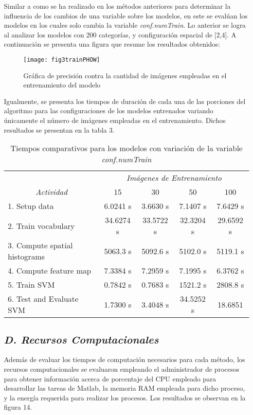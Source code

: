 \documentclass[10pt,twocolumn,letterpaper]{article}
\begin{document}
Similar a como se ha realizado en los métodos anteriores para determinar la influencia de los cambios de una variable sobre los modelos, en este se evalúan los modelos en los cuales solo cambia la variable \textit{conf.numTrain}. Lo anterior se logra al analizar los modelos con 200 categorías, y configuración espacial de [2,4]. A continuación se presenta una figura que resume los resultados obtenidos:

\begin{figure}
\begin{center}
   \texttt{[image: fig3trainPHOW]}
\end{center}
   \caption{Gráfica de precisión contra la cantidad de imágenes empleadas en el entrenamiento del modelo}
\end{figure}

Igualmente, se presenta los tiempos de duración de cada una de las porciones del algoritmo para las configuraciones de los modelos entrenados variando únicamente el número de imágenes empleadas en el entrenamiento. Dichos resultados se presentan en la tabla 3.

\begin{table*}
\caption{Tiempos comparativos para los modelos con variación de la variable \textit{conf.numTrain}}
\centering
\begin{tabular}{lcccc}
 & \multicolumn{4}{c}{\textit{Imágenes de Entrenamiento}} \\
\multicolumn{1}{c}{\textit{Actividad}} & 15 & 30 & 50 & 100 \\ \hline
1. Setup data & 6.0241 s & 3.6630 s & 7.1407 s & 7.6429 s \\ \hline
2. Train vocabulary & 34.6274 s & 33.5722 s & 32.3204 s & 29.6592 s \\ \hline
3. Compute spatial histograms & 5063.3 s & 5092.6 s & 5102.0 s & 5119.1 s \\ \hline
4. Compute feature map & 7.3384 s & 7.2959 s & 7.1995 s & 6.3762 s \\ \hline
5. Train SVM & 0.7842 s & 0.7683 s & 1521.2 s & 2808.8 s \\ \hline
6. Test and Evaluate SVM & 1.7300 s & 3.4048  s & 34.5252 s & 18.6851 \\ \hline
\end{tabular}
\end{table*}

\subsection{ \textit{D. Recursos Computacionales}}
Además de evaluar los tiempos de computación necesarios para cada método, los recursos computacionales se evaluaron empleando el administrador de procesos para obtener información acerca de porcentaje del CPU empleado para desarrollar las tareas de Matlab, la memoria RAM empleada para dicho proceso, y la energía requerida para realizar los procesos. Los resultados se observan en la figura 14.
\end{document}
